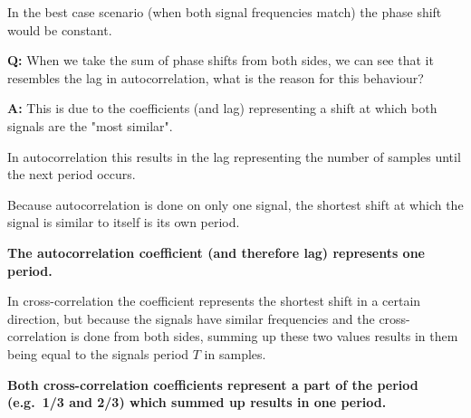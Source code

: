\documentclass[a4paper, 11pt]{article}
\begin{document}
\begin{enumerate}
        In the best case scenario (when both signal frequencies match) the phase shift would be constant.

        \vspace{6mm}

        \textbf{Q:} When we take the sum of phase shifts from both sides,
        we can see that it resembles the lag in autocorrelation,
        what is the reason for this behaviour?

        \textbf{A:} This is due to the coefficients (and lag) representing a shift at which both signals are the "most similar".

        In autocorrelation this results in the lag representing the number of samples until the next period occurs.

        Because autocorrelation is done on only one signal,
        the shortest shift at which the signal is similar to itself is its own period.

        \textbf{The autocorrelation coefficient (and therefore lag) represents one period.}

        In cross-correlation the coefficient represents the shortest shift in a certain direction,
        but because the signals have similar frequencies and the cross-correlation is done from both sides,
        summing up these two values results in them
        being equal to the signals period $T$ in samples.

        \textbf{Both cross-correlation coefficients represent a part of the period (e.g.\ 1/3 and 2/3)
        which summed up results in one period.}
    \end{enumerate}
\end{document}
